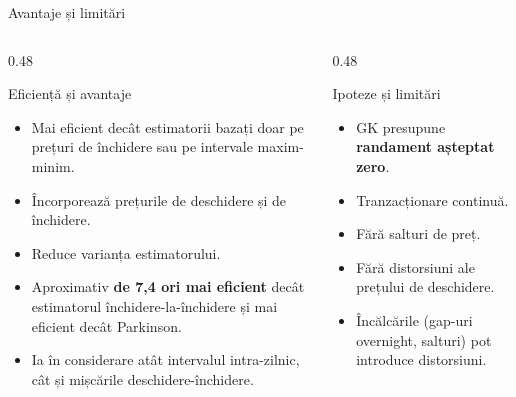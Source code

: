 \documentclass[9pt, aspectratio=169, t]{beamer}
\theoremstyle{definition}
\begin{document}
\begin{frame}{Avantaje și limitări}
\begin{columns}[T]
\begin{column}{0.48\textwidth}
\begin{block}{Eficiență și avantaje}
\begin{itemize}
    \item Mai eficient decât estimatorii bazați doar pe prețuri de închidere sau pe intervale maxim-minim.
    \item Încorporează prețurile de deschidere și de închidere.
    \item Reduce varianța estimatorului.
    \item Aproximativ \textbf{de 7,4 ori mai eficient} decât estimatorul închidere-la-închidere și mai eficient decât Parkinson.
    \item Ia în considerare atât intervalul intra-zilnic, cât și mișcările deschidere-închidere.
\end{itemize}
\end{block}
\end{column}
\begin{column}{0.48\textwidth}
\begin{alertblock}{Ipoteze și limitări}
\begin{itemize}
    \item GK presupune \textbf{randament așteptat zero}.
    \item Tranzacționare continuă.
    \item Fără salturi de preț.
    \item Fără distorsiuni ale prețului de deschidere.
    \item Încălcările (gap-uri overnight, salturi) pot introduce distorsiuni.
\end{itemize}
\end{alertblock}
\end{column}
\end{columns}
\end{frame}
\end{document}
